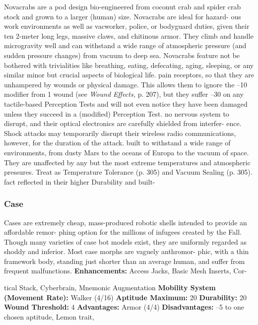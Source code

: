 Novacrabs are a pod design bio-engineered from 
coconut crab and spider crab stock and grown to a 
larger (human) size. Novacrabs are ideal for hazard-
ous work environments as well as vacworker, police, 
or bodyguard duties, given their ten 2-meter long legs, 
massive claws, and chitinous armor. They climb and 
handle microgravity well and can withstand a wide 
range of atmospheric pressure (and sudden pressure 
changes) from vacuum to deep sea. Novacrabs feature 
not be bothered with trivialities like breathing, 
eating, defecating, aging, sleeping, or any similar 
minor but crucial aspects of biological life.
pain receptors, so that they are unhampered by 
wounds or physical damage. This allows them 
to ignore the –10 modifier from 1 wound (see 
\textit{Wound Effects,} p. 207), but they suffer –30 on 
any tactile-based Perception Tests and will not 
even notice they have been damaged unless they 
succeed in a (modified) Perception Test.
no nervous system to disrupt, and their optical 
electronics are carefully shielded from interfer-
ence. Shock attacks may temporarily disrupt their 
wireless radio communications, however, for the 
duration of the attack.
built to withstand a wide range of environments, 
from dusty Mars to the oceans of Europa to the 
vacuum of space. They are unaffected by any but 
the most extreme temperatures and atmospheric 
pressures. Treat as Temperature Tolerance (p. 
305) and Vacuum Sealing (p. 305).
fact reflected in their higher Durability and built-

\subsubsection{Case}

Cases are extremely cheap, mass-produced robotic 
shells intended to provide an affordable remor-
phing option for the millions of infugees created by 
the Fall. Though many varieties of case bot models 
exist, they are uniformly regarded as shoddy and 
inferior. Most case morphs are vaguely anthromor-
phic, with a thin framework body, standing just 
shorter than an average human, and suffer from 
frequent malfunctions.
\textbf{Enhancements: }Access Jacks, Basic Mesh Inserts, Cor-

tical Stack, Cyberbrain, Mnemonic Augmentation
\textbf{Mobility System (Movement Rate):} Walker (4/16)
\textbf{Aptitude Maximum: }20
\textbf{Durability:} 20
\textbf{Wound Threshold:} 4
\textbf{Advantages:} Armor (4/4)
\textbf{Disadvantages: }–5 to one chosen aptitude, Lemon trait, 

